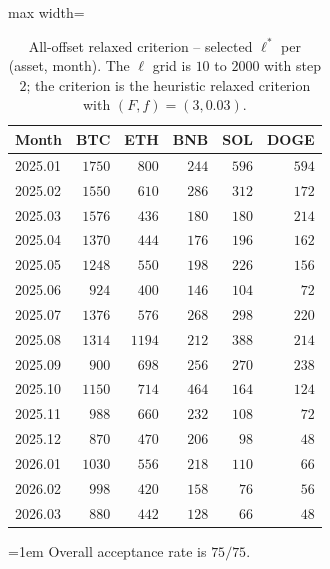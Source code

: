 \documentclass[11pt,titlepage,openany,oneside]{book}  %
\newcommand{\floatnote}[1]{%
  \par\smallskip\noindent%
  \begin{minipage}{\linewidth}%
    \footnotesize\emergencystretch=1em #1%
  \end{minipage}\par%
}
\begin{document}
\begin{table}[!htbp]
  \caption[All-offset relaxed criterion -- selected $\ell^*$]{All-offset relaxed criterion -- selected $\ell^*$ per (asset, month). The $\ell$ grid is $10$ to $2000$ with step $2$; the criterion is the heuristic relaxed criterion with $(F, f) = (3, 0.03)$.}
  \label{tab:appendix-a4}
  \begin{center}
    \begin{adjustbox}{max width=\textwidth}
    \begin{tabular}{lrrrrr}
      \toprule
      Month   & BTC    & ETH    & BNB   & SOL   & DOGE  \\
      \midrule
      2025.01 & $1750$ & $800$  & $244$ & $596$ & $594$ \\
      2025.02 & $1550$ & $610$  & $286$ & $312$ & $172$ \\
      2025.03 & $1576$ & $436$  & $180$ & $180$ & $214$ \\
      2025.04 & $1370$ & $444$  & $176$ & $196$ & $162$ \\
      2025.05 & $1248$ & $550$  & $198$ & $226$ & $156$ \\
      2025.06 & $924$  & $400$  & $146$ & $104$ & $72$  \\
      2025.07 & $1376$ & $576$  & $268$ & $298$ & $220$ \\
      2025.08 & $1314$ & $1194$ & $212$ & $388$ & $214$ \\
      2025.09 & $900$  & $698$  & $256$ & $270$ & $238$ \\
      2025.10 & $1150$ & $714$  & $464$ & $164$ & $124$ \\
      2025.11 & $988$  & $660$  & $232$ & $108$ & $72$  \\
      2025.12 & $870$  & $470$  & $206$ & $98$  & $48$  \\
      2026.01 & $1030$ & $556$  & $218$ & $110$ & $66$  \\
      2026.02 & $998$  & $420$  & $158$ & $76$  & $56$  \\
      2026.03 & $880$  & $442$  & $128$ & $66$  & $48$  \\
      \bottomrule
    \end{tabular}
    \end{adjustbox}
  \end{center}
  \floatnote{Overall acceptance rate is $75/75$.}
\end{table}
\end{document}
